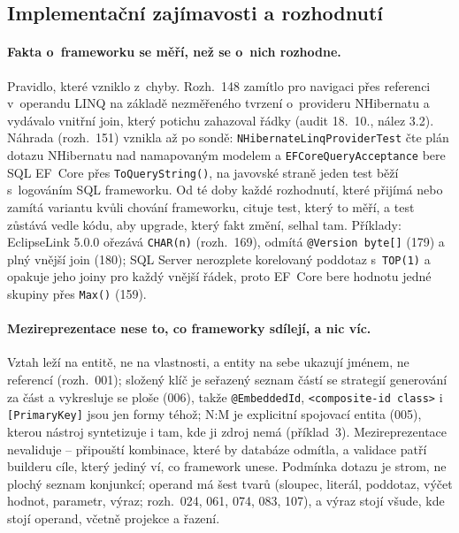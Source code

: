 \documentclass{article}
\begin{document}
\subsection{Implementační zajímavosti a rozhodnutí}\label{sec:zajimavosti}

\paragraph{Fakta o~frameworku se měří, než se o~nich rozhodne.} Pravidlo, které vzniklo z~chyby. Rozh.~148 zamítlo  pro navigaci přes referenci v~operandu LINQ na základě nezměřeného tvrzení o~provideru NHibernatu a vydávalo vnitřní join, který potichu zahazoval řádky (audit 18.~10., nález 3.2). Náhrada (rozh.~151) vznikla až po sondě: \texttt{NHibernateLinqProviderTest} čte plán dotazu NHibernatu nad namapovaným modelem a \texttt{EFCoreQueryAcceptance} bere SQL EF~Core přes \texttt{ToQueryString()}, na javovské straně jeden test běží s~logováním SQL frameworku. Od té doby každé rozhodnutí, které přijímá nebo zamítá variantu kvůli chování frameworku, cituje test, který to měří, a test zůstává vedle kódu, aby upgrade, který fakt změní, selhal tam. Příklady: EclipseLink 5.0.0 ořezává \texttt{CHAR(n)} (rozh.~169), odmítá \texttt{@Version byte[]} (179) a plný vnější join (180); SQL Server nerozplete korelovaný poddotaz s~\texttt{TOP(1)} a opakuje jeho joiny pro každý vnější řádek, proto EF~Core bere hodnotu jedné skupiny přes \texttt{Max()} (159).

\paragraph{Mezireprezentace nese to, co frameworky sdílejí, a nic víc.} Vztah leží na entitě, ne na vlastnosti, a entity na sebe ukazují jménem, ne referencí (rozh.~001); složený klíč je seřazený seznam částí se strategií generování za část a vykresluje se ploše (006), takže \texttt{@EmbeddedId}, \texttt{<composite-id class>} i \texttt{[PrimaryKey]} jsou jen formy téhož; N:M je explicitní spojovací entita (005), kterou nástroj syntetizuje i tam, kde ji zdroj nemá (příklad~3). Mezireprezentace nevaliduje -- připouští kombinace, které by databáze odmítla, a validace patří builderu cíle, který jediný ví, co framework unese. Podmínka dotazu je strom, ne plochý seznam konjunkcí; operand má šest tvarů (sloupec, literál, poddotaz, výčet hodnot, parametr, výraz; rozh.~024, 061, 074, 083, 107), a výraz stojí všude, kde stojí operand, včetně projekce a řazení.
\end{document}
